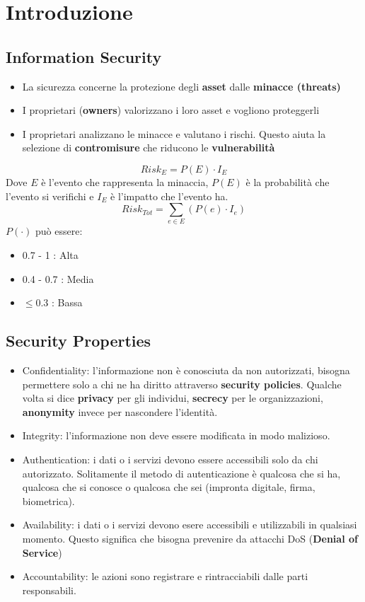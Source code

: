 \documentclass[12pt, a4paper]{report}
\begin{document}
\newpage
\tableofcontents
\chapter{Introduzione}
\section{Information Security}
\begin{itemize}
    \item La sicurezza concerne la protezione degli \textbf{asset} dalle \textbf{minacce (threats)}
    \item I proprietari (\textbf{owners}) valorizzano i loro asset e vogliono  proteggerli
    \item I proprietari analizzano le minacce e valutano i rischi. Questo aiuta la selezione di \textbf{contromisure} che riducono le \textbf{vulnerabilità}
\end{itemize}
\begin{equation*}
    Risk_{E} = P(E) \cdot I_{E}
\end{equation*}
Dove $E$ è l'evento che rappresenta la minaccia, $P(E)$ è la probabilità che l'evento si verifichi e $I_{E}$ è l'impatto che l'evento ha.
\begin{equation*}
    Risk_{Tot} = \sum_{e\in E} (P(e) \cdot I_{e})
\end{equation*}
$P(\cdot)$ può essere:
\begin{itemize}
    \item 0.7 - 1 : Alta
    \item 0.4 - 0.7 : Media
    \item $\leq 0.3$ : Bassa
\end{itemize}
\section{Security Properties}
\begin{itemize}
    \item Confidentiality: l'informazione non è conosciuta da non autorizzati, bisogna permettere solo a chi ne ha diritto attraverso \textbf{security policies}. Qualche volta si dice \textbf{privacy} per gli individui, \textbf{secrecy} per le organizzazioni, \textbf{anonymity} invece per nascondere l'identità.
    \item Integrity: l'informazione non deve essere modificata in modo malizioso.
    \item Authentication: i dati o i servizi devono essere accessibili solo da chi autorizzato. Solitamente il metodo di autenticazione è qualcosa che si ha, qualcosa che si conosce o qualcosa che sei (impronta digitale, firma, biometrica).
    \item Availability: i dati o i servizi devono esere accessibili e utilizzabili in qualsiasi momento. Questo significa che bisogna prevenire da attacchi DoS (\textbf{Denial of Service})
    \item Accountability: le azioni sono registrare e rintracciabili dalle parti responsabili.
\end{itemize}
\end{document}
